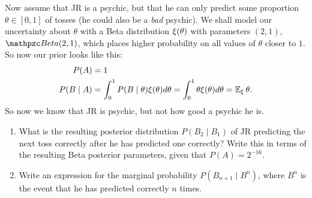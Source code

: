 \documentclass[twoside,a4paper]{article}
\begin{document}
\begin{exercise}
  Now assume that JR is a psychic, but that he can only predict some proportion $\theta \in [0,1]$ of tosses (he could also be a \emph{bad} psychic).
We shall model our uncertainty about $\theta$ with a Beta distribution $\xi(\theta)$ with parameters $(2, 1)$, $\Beta(2,1)$, which places higher probability on all values of $\theta$ closer to $1$. So now our prior looks like this:
\begin{align}
  P(A) &= 1\\
  P(B \mid A) &= \int_0^1 P(B \mid \theta) \xi(\theta) d\theta = \int_0^1 \theta \xi(\theta) d\theta = \mathop{\mbox{\ensuremath{\mathbb{E}}}}\nolimits_\xi \theta.\\
\end{align}
So now we know that JR is psychic, but not how good a psychic he is.
\begin{enumerate}
\item What is the resulting posterior distribution $P(B_2 \mid B_1)$ of JR predicting the next toss correctly after he has predicted one correctly? Write this in terms of the resulting Beta posterior parameters, given that $P(A) = 2^{-16}$.
\item Write an expression for the marginal probability $P(B_{n+1} \mid B^n)$, where $B^n$ is the event that he has predicted correctly $n$ times.
\end{enumerate}

\end{exercise}
\end{document}
